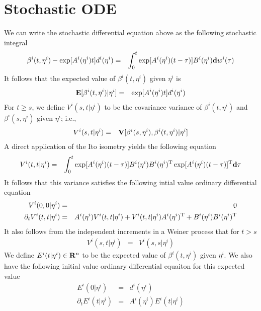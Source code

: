 \documentclass{article}
\newcommand{\BE}{{\bf E}}
\newcommand{\BR}{{\bf R}}
\newcommand{\RT}{{\rm T}}
\newcommand{\BV}{{\bf V}}
\newcommand{\Bd}{{\bf d}}
\begin{document}
\section{Stochastic ODE}
We can write the stochastic differential equation above
as the following stochastic integral 
\begin{eqnarray*}
\beta^i ( t , \eta^i ) - \exp[ A^i (  \eta^i ) t ] d^i ( \eta^i ) 
& = &
\int_{0}^{t}
\exp[ A^i (  \eta^i ) ( t - \tau ) ] B^i (  \eta^i ) \Bd w^i ( \tau ) 
\end{eqnarray*}
It follows that the expected value of \( \beta^i (t, \eta^i ) \)
given \( \eta^i \) is
\begin{eqnarray*}
\BE [ \beta^i (t, \eta^i ) | \eta^i ]
& = &
\exp[ A^i (  \eta^i ) t ] d^i ( \eta^i )
\end{eqnarray*}
For \( t \geq s \), we define \( V^i (s , t | \eta^i ) \) 
to be the covariance variance of \( \beta^i (t, \eta^i ) \) 
and \( \beta^i (s, \eta^i ) \) given \( \eta^i \); i.e., 
\begin{eqnarray*}
V^i (s , t | \eta^i )
& = &
\BV [ \beta^i (s, \eta^i ) , \beta^i (t, \eta^i ) | \eta^i ]
\end{eqnarray*}
A direct application of the Ito isometry yields the following equation
\begin{eqnarray*}
V^i (t , t | \eta^i )
& = &
\int_0^{t}
\exp[ A^i (  \eta^i ) ( t - \tau ) ] 
	B^i (  \eta^i ) B^i (  \eta^i )^\RT 
		\exp[ A^i (  \eta^i ) ( t - \tau ) ]^\RT
			\Bd \tau
\end{eqnarray*}
It follows that this variance satisfies the following
intial value ordinary differential equation
\begin{eqnarray*}
V^i ( 0 ,  0 | \eta^i ) & = & 0
\\
\partial_t  V^i (t , t |  \eta^i )  
& = & A^i  (  \eta^i ) V^i (t , t | \eta^i ) 
  +   V^i (t , t | \eta^i ) A^i (  \eta^i )^\RT 
  +   B^i (  \eta^i ) B^i (  \eta^i )^\RT 
\end{eqnarray*}
It also follows from the independent increments in a Weiner process that
for \( t > s \)
\begin{eqnarray*}
V^i ( s , t | \eta^i ) & = & V^i (s , s | \eta^i )
\end{eqnarray*}
We define \( E^i (t | \eta^i ) \in \BR^n \) to be the expected value
of \( \beta^i (t, \eta^i ) \) given \( \eta^i \).
We also have the following initial value ordinary differential equaiton
for this expected value
\begin{eqnarray*}
E^i (0 | \eta^i ) & = & d^i ( \eta^i )
\\
\partial_t E^i (t | \eta^i ) & = & A^i  (  \eta^i ) E^i (t | \eta^i )
\end{eqnarray*}
\end{document}
